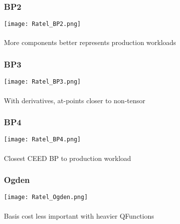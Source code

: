 \documentclass{beamer}
\begin{document}

\begin{frame}
\begin{center}
\frametitle{BP2}

\texttt{[image: Ratel\_BP2.png]}\\

~\\

More components better represents production workloads

\end{center}
\end{frame}


\begin{frame}
\begin{center}
\frametitle{BP3}

\texttt{[image: Ratel\_BP3.png]}\\

~\\

With derivatives, at-points closer to non-tensor

\end{center}
\end{frame}


\begin{frame}
\begin{center}
\frametitle{BP4}

\texttt{[image: Ratel\_BP4.png]}\\

~\\

Closest CEED BP to production workload

\end{center}
\end{frame}


\begin{frame}
\begin{center}
\frametitle{Ogden}

\texttt{[image: Ratel\_Ogden.png]}\\

~\\

Basis cost less important with heavier QFunctions

\end{center}
\end{frame}
\end{document}
